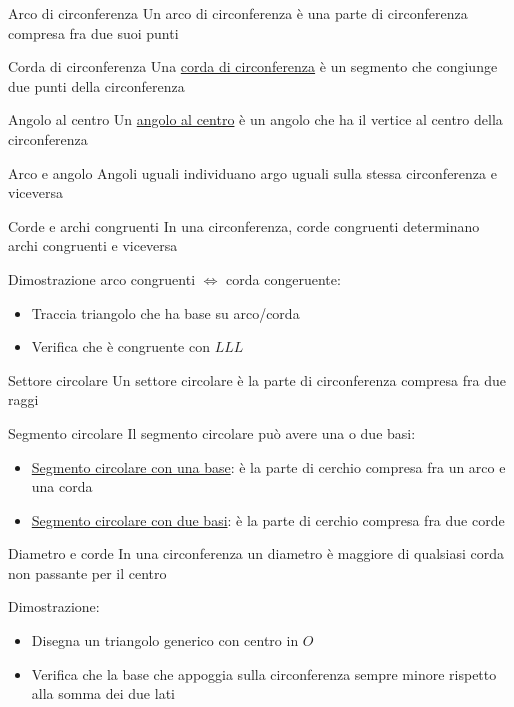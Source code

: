 \begin{definizione}{Arco di circonferenza}
	Un arco di circonferenza è una parte di circonferenza compresa fra due suoi punti
\end{definizione}
\begin{definizione}{Corda di circonferenza}
	Una \underline{corda di circonferenza} è un segmento che congiunge due punti della circonferenza
\end{definizione}
\begin{definizione}{Angolo al centro}
	Un \underline{angolo al centro} è un angolo che ha il vertice al centro della circonferenza
\end{definizione}

\begin{teorema}{Arco e angolo}
	Angoli uguali individuano argo uguali sulla stessa circonferenza e viceversa
\end{teorema}

\begin{teorema}{Corde e archi congruenti}
	In una circonferenza, corde congruenti determinano archi congruenti e viceversa
\end{teorema}

Dimostrazione arco congruenti $ \Leftrightarrow   $ corda congeruente:
\begin{itemize}
	\item Traccia triangolo che ha base su arco/corda
	\item Verifica che è congruente con $ LLL $
\end{itemize}

\begin{definizione}{Settore circolare}
	Un settore circolare è la parte di circonferenza compresa fra due raggi
\end{definizione}

\begin{definizione}{Segmento circolare}
	Il segmento circolare può avere una o due basi:
	\begin{itemize}
		\item \underline{Segmento circolare con una base}: è la parte di cerchio compresa fra un arco e una corda
		\item \underline{Segmento circolare con due basi}: è la parte di cerchio compresa fra due corde
	\end{itemize}
\end{definizione}

\begin{teorema}{Diametro e corde}
	In una circonferenza un diametro è maggiore di qualsiasi corda non passante per il centro
\end{teorema}
Dimostrazione:
\begin{itemize}
	\item Disegna un triangolo generico con centro in $ O $
	\item Verifica che la base che appoggia sulla circonferenza sempre minore rispetto alla somma dei due lati
\end{itemize}

